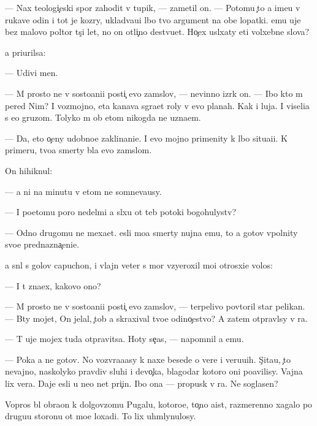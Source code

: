 \documentclass[10pt]{book}
\begin{document}
— Nax teologi{\c}eski{\y} spor zahodit v tupik, — zametil on. — Potomu {\c}to {\y}a ime{\y}u v rukave odin i tot je koz{\yi}ry, uklad{\yi}va{\y}u{\x}i{\y} l{\iu}bo{\y} tvo{\y} argument na obe lopatki. {\Y}emu uje bez malovo poltor{\yi} t{\yi}s{\ia}{\c}i let, no on otli{\c}no de{\y}stvu{\y}et. Ho{\c}ex usl{\yi}xaty eti volxebn{\yi}{\y}e slova?

{\Y}a pri{\x}urilsa:

— Udivi men{\ia}.

— M{\yi} prosto ne v sosto{\y}ani{\y}i posti{\c} {\Y}evo zam{\yi}slov, — nevinno izr{\e}k on. — Ibo kto m{\yi} pered Nim? I vozmojno, eta kanava s{\yi}gra{\y}et roly v {\Y}evo planah. Kak i luja. I viseli{\q}a s {\y}e{\y}o gruzom. Tolyko m{\yi} ob etom nikogda ne uzna{\y}em.

— Da, eto o{\c}eny udobno{\y}e zaklinani{\y}e. I {\y}evo mojno primenity k l{\iu}bo{\y} situa{\q}i{\y}i. K primeru, tvo{\y}a smerty b{\yi}la {\y}evo zam{\yi}slom.

On hihiknul:

— {\Y}a ni na minutu v etom ne somneva{\y}usy.

— I poetomu poro{\y} nedel{\ia}mi {\y}a sl{\yi}xu ot teb{\ia} potoki bogohulystv?

— Odno drugomu ne mexa{\y}et. {\Y}esli mo{\y}a smerty nujna {\Y}emu, to {\y}a gotov v{\yi}polnity svo{\y}e prednazna{\c}eni{\y}e.

{\Y}a sn{\ia}l s golov{\yi} capuchon, i vlajn{\yi}{\y} veter s mor{\ia} vzyeroxil mo{\y}i otrosxi{\y}e volos{\yi}:

— I t{\yi} zna{\y}ex, kakovo ono?

— M{\yi} prosto ne v sosto{\y}ani{\y}i posti{\c} {\Y}evo zam{\yi}slov, — terpelivo povtoril star{\yi}{\y} pelikan. — B{\yi}ty mojet, On jelal, {\c}tob{\yi} {\y}a skraxival tvo{\y}e odino{\c}estvo? A zatem otpravl{\iu}sy v ra{\y}.

— T{\yi} uje mojex tuda otpravitsa. Hoty se{\y}{\c}as, — napomnil {\y}a {\y}emu.

— Poka {\y}a ne gotov. No vozvra{\x}a{\y}asy k naxe{\y} besede o vere i veru{\y}u{\x}ih. S{\c}ita{\y}u, {\c}to nevajno, naskolyko pravdiv{\yi} sluhi i devo{\c}ka, blagodar{\ia} kotoro{\y} oni po{\y}avilisy. Vajna lix vera. Daje {\y}esli u ne{\y}o net pri{\c}in{\yi}. Ibo ona — propusk v ra{\y}. Ne soglasen?

Vopros b{\yi}l obra{\x}on k dolgov{\ia}zomu Pugalu, kotoro{\y}e, to{\c}no aist, razmerenno xagalo po drugu{\y}u storonu ot mo{\y}e{\y} loxadi. To lix uhm{\yi}lynulosy.
\end{document}
